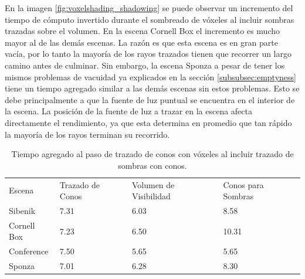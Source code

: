 En la imagen \ref{fig:voxelshading_shadowing} se puede observar un incremento del tiempo de cómputo invertido durante el sombreado de vóxeles al incluir sombras trazadas sobre el volumen. En la escena Cornell Box el incremento es mucho mayor al de las demás escenas. La razón es que esta escena es en gran parte vacía, por lo tanto la mayoría de los rayos trazados tienen que recorrer un largo camino antes de culminar. Sin embargo, la escena Sponza a pesar de tener los mismos problemas de vacuidad ya explicados en la sección \ref{subsubsec:emptyness} tiene un tiempo agregado similar a las demás escenas sin estos problemas. Esto se debe principalmente a que la fuente de luz puntual se encuentra en el interior de la escena. La posición de la fuente de luz a trazar en la escena afecta directamente el rendimiento, ya que esta determina en promedio que tan rápido la mayoría de los rayos terminan su recorrido.

\begin{table}[H]
\centering
\begin{tabular}{llll}
                                  &                                       &                                             &                                         \\ \hline
\multicolumn{1}{|l|}{Escena}      & \multicolumn{1}{l|}{Trazado de Conos} & \multicolumn{1}{l|}{Volumen de Visibilidad} & \multicolumn{1}{l|}{Conos para Sombras} \\ \hline
\multicolumn{1}{|l|}{Sibenik}     & \multicolumn{1}{l|}{7.31}             & \multicolumn{1}{l|}{6.03}                   & \multicolumn{1}{l|}{8.58}               \\
\multicolumn{1}{|l|}{Cornell Box} & \multicolumn{1}{l|}{7.23}             & \multicolumn{1}{l|}{6.50}                   & \multicolumn{1}{l|}{10.31}              \\
\multicolumn{1}{|l|}{Conference}  & \multicolumn{1}{l|}{7.50}             & \multicolumn{1}{l|}{5.65}                   & \multicolumn{1}{l|}{5.65}               \\
\multicolumn{1}{|l|}{Sponza}      & \multicolumn{1}{l|}{7.01}             & \multicolumn{1}{l|}{6.28}                   & \multicolumn{1}{l|}{8.30}               \\ \hline
\end{tabular}
\caption{Tiempo agregado al paso de trazado de conos con vóxeles al incluir trazado de sombras con conos.}
\label{tab:shadowcone5}
\end{table}

